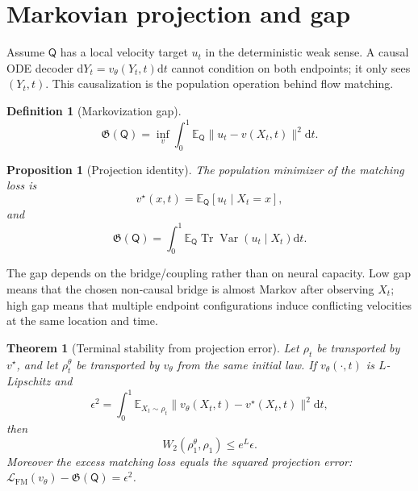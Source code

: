 \documentclass{article}
\newtheorem{definition}{Definition}
\newtheorem{theorem}{Theorem}
\newtheorem{proposition}{Proposition}
\numberwithin{equation}{section}
\newcommand{\E}{\mathbb{E}}
\newcommand{\dd}{\mathrm{d}}
\newcommand{\scrQ}{\mathsf{Q}}
\newcommand{\Var}{\operatorname{Var}}
\newcommand{\Tr}{\operatorname{Tr}}
\begin{document}
\section{Markovian projection and gap}
\label{sec:markovization}

Assume $\scrQ$ has a local velocity target $u_t$ in the deterministic weak sense. A causal ODE decoder $\dd Y_t=v_\theta(Y_t,t)\dd t$ cannot condition on both endpoints; it only sees $(Y_t,t)$. This causalization is the population operation behind flow matching.

\begin{definition}[Markovization gap]
\label{def:gap}
\begin{equation}
    \mathfrak G(\scrQ)
    =\inf_v\int_0^1\E_{\scrQ}\|u_t-v(X_t,t)\|^2\dd t .
    \label{eq:markov_gap_def}
\end{equation}
\end{definition}

\begin{proposition}[Projection identity]
\label{prop:projection}
The population minimizer of the matching loss is
\begin{equation}
    v^\star(x,t)=\E_{\scrQ}[u_t\mid X_t=x],
\end{equation}
and
\begin{equation}
    \mathfrak G(\scrQ)=\int_0^1\E_{\scrQ}\Tr\Var(u_t\mid X_t)\dd t .
    \label{eq:gap_variance}
\end{equation}
\end{proposition}

The gap depends on the bridge/coupling rather than on neural capacity. Low gap means that the chosen non-causal bridge is almost Markov after observing $X_t$; high gap means that multiple endpoint configurations induce conflicting velocities at the same location and time.

\begin{theorem}[Terminal stability from projection error]
\label{thm:stability}
Let $\rho_t$ be transported by $v^\star$, and let $\rho^\theta_t$ be transported by $v_\theta$ from the same initial law. If $v_\theta(\cdot,t)$ is $L$-Lipschitz and
\begin{equation}
    \epsilon^2=\int_0^1\E_{X_t\sim\rho_t}\|v_\theta(X_t,t)-v^\star(X_t,t)\|^2\dd t,
\end{equation}
then
\begin{equation}
    W_2(\rho^\theta_1,\rho_1)\le e^L\epsilon .
    \label{eq:stability_bound}
\end{equation}
Moreover the excess matching loss equals the squared projection error:
$\mathcal L_{\mathrm{FM}}(v_\theta)-\mathfrak G(\scrQ)=\epsilon^2$.
\end{theorem}
\end{document}
